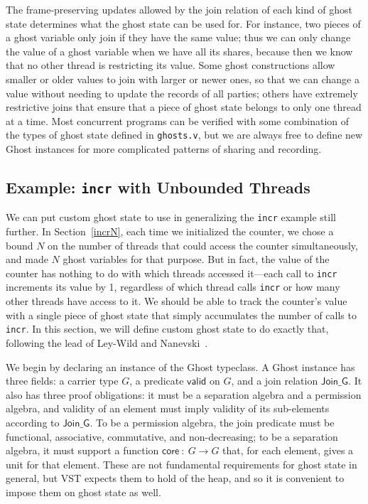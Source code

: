 \documentclass[11pt]{article}
\begin{document}
The frame-preserving updates allowed by the join relation of each kind of ghost state determines what the ghost state can be used for. For instance, two pieces of a ghost variable only join if they have the same value; thus we can only change the value of a ghost variable when we have all its shares, because then we know that no other thread is restricting its value. Some ghost constructions allow smaller or older values to join with larger or newer ones, so that we can change a value without needing to update the records of all parties; others have extremely restrictive joins that ensure that a piece of ghost state belongs to only one thread at a time. Most concurrent programs can be verified with some combination of the types of ghost state defined in \texttt{ghosts.v}, but we are always free to define new \textsf{Ghost} instances for more complicated patterns of sharing and recording.

\subsection{Example: \texttt{incr} with Unbounded Threads}
\label{incr-gen}
We can put custom ghost state to use in generalizing the \texttt{incr} example still further. In Section~\ref{incrN}, each time we initialized the counter, we chose a bound $N$ on the number of threads that could access the counter simultaneously, and made $N$ ghost variables for that purpose. But in fact, the value of the counter has nothing to do with which threads accessed it---each call to \texttt{incr} increments its value by 1, regardless of which thread calls \texttt{incr} or how many other threads have access to it. We should be able to track the counter's value with a single piece of ghost state that simply accumulates the number of calls to \texttt{incr}. In this section, we will define custom ghost state to do exactly that, following the lead of Ley-Wild and Nanevski~\cite{subjective}.

We begin by declaring an instance of the \textsf{Ghost} typeclass. A \textsf{Ghost} instance has three fields: a carrier type $G$, a predicate $\mathsf{valid}$ on $G$, and a join relation $\mathsf{Join\_G}$. It also has three proof obligations: it must be a separation algebra and a permission algebra, and validity of an element must imply validity of its sub-elements according to $\mathsf{Join\_G}$. To be a permission algebra, the join predicate must be functional, associative, commutative, and non-decreasing; to be a separation algebra, it must support a function $\mathsf{core}\::\:G \rightarrow G$ that, for each element, gives a unit for that element. These are not fundamental requirements for ghost state in general, but VST expects them to hold of the heap, and so it is convenient to impose them on ghost state as well.
\end{document}
